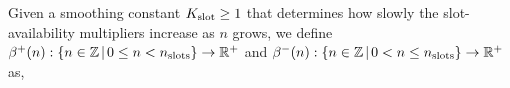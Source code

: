 Given a smoothing constant $K_\textnormal{slot} \geq 1$ that determines how slowly the slot-availability multipliers increase as $n$ grows,
we define $\beta^+(n): \{n\in \mathbb{Z} \hspace{0.02in}|\hspace{0.02in}  0 \leq n < n_\textnormal{slots} \}\rightarrow \mathbb{R}^+$ and $\beta^-(n): \{n\in \mathbb{Z} \hspace{0.02in}|\hspace{0.02in}  0 < n \leq n_\textnormal{slots} \}\rightarrow \mathbb{R}^+$ as,


